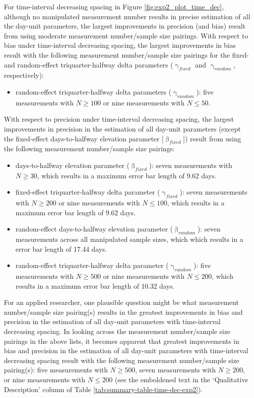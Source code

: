 \documentclass[
12pt, %
twoside,
english]{guelphthesis}
\begin{document}
For time-interval decreasing spacing in Figure \ref{fig:exp2_plot_time_dec}, although no manipulated measurement number results in precise estimation of all the day-unit parameters, the largest improvements in precision (and bias) result from using moderate measurement number/sample size pairings. With respect to bias under time-interval decreasing spacing, the largest improvements in bias result with the following measurement number/sample size pairings for the fixed- and random-effect triquarter-halfway delta parameters (\(\upgamma_{fixed}\) and \(\upgamma_{random}\), respectively):
\begin{itemize}
\tightlist
\item
  random-effect triquarter-halfway delta parameters (\(\upgamma_{random}\)): five measurements with \(N \ge 100\) or nine measurements with \(N \le 50\).
\end{itemize}
\noindent With respect to precision under time-interval decreasing spacing, the largest improvements in precision in the estimation of all day-unit parameters (except the fixed-effect days-to-halfway elevation parameter {[}\(\upbeta_{fixed}\){]}) result from using the following measurement number/sample size pairings:
\begin{itemize}
\tightlist
\item
  days-to-halfway elevation parameter (\(\upbeta_{fixed}\)): seven measurements with \(N \ge 30\), which results in a maximum error bar length of 9.62 days.
\item
  fixed-effect triquarter-halfway delta parameter (\(\upgamma_{fixed}\)): seven measurements with \(N \ge 200\) or nine measurements with \(N \le 100\), which results in a maximum error bar length of 9.62 days.
\item
  random-effect days-to-halfway elevation parameter (\(\upbeta_{random}\)): seven measurements across all manipulated sample sizes, which which results in a error bar length of 17.44 days.
\item
  random-effect triquarter-halfway delta parameter (\(\upgamma_{random}\)): five measurements with \(N \ge 500\) or nine measurements with \(N \le 200\), which results in a maximum error bar length of 10.32 days.
\end{itemize}
For an applied researcher, one plausible question might be what measurement number/sample size pairing(s) results in the greatest improvements in bias and precision in the estimation of all day-unit parameters with time-interval decreasing spacing. In looking across the measurement number/sample size pairings in the above lists, it becomes apparent that greatest improvements in bias and precision in the estimation of all day-unit parameters with time-interval decreasing spacing result with the following measurement number/sample size pairing(s): five measurements with \(N \ge 500\), seven measurements with \(N \ge 200\), or nine measurements with \(N \le 200\) (see the emboldened text in the `Qualitative Description' column of Table \ref{tab:summary-table-time-dec-exp2}).
\end{document}
